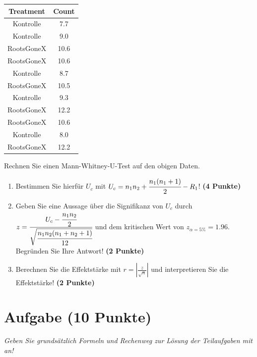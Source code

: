 \documentclass[a4paper, 10pt]{scrartcl}\usepackage[]{graphicx}\usepackage[]{xcolor}
\newenvironment{knitrout}{}{} %
\begin{document}
\begin{knitrout}
\color{fgcolor}\begin{table}[!h]
\centering
\begin{tabular}{cc}
\toprule
Treatment & Count\\
\midrule
Kontrolle & 7.7\\
Kontrolle & 9.0\\
RootsGoneX & 10.6\\
RootsGoneX & 10.6\\
Kontrolle & 8.7\\
\addlinespace
RootsGoneX & 10.5\\
Kontrolle & 9.3\\
RootsGoneX & 12.2\\
RootsGoneX & 10.6\\
Kontrolle & 8.0\\
\addlinespace
RootsGoneX & 12.2\\
\bottomrule
\end{tabular}
\end{table}

\end{knitrout}

Rechnen Sie einen Mann-Whitney-U-Test auf den obigen Daten.

\begin{enumerate}
\item Bestimmen Sie hierf{\"u}r $U_c$ mit $U_c = n_1n_2 +
  \cfrac{n_1(n_1+1)}{2}-R_1$! \textbf{(4 Punkte)} 
\item Geben Sie eine Aussage {\"u}ber die Signifikanz von $U_c$ durch
  $z = \cfrac{U_c -
    \cfrac{n_1n_2}{2}}{\sqrt{\cfrac{n_1n_2(n_1+n_2+1)}{12}}}$ und dem
  kritischen Wert von $z_{\alpha = 5\%} = 1.96$. Begr{\"u}nden Sie Ihre
  Antwort! \textbf{(2 Punkte)}
\item Berechnen Sie die Effektst{\"a}rke mit $r = |\frac{z}{\sqrt{n}}| $ und
  interpretieren Sie die Effektst{\"a}rke! \textbf{(2 Punkte)} 
\end{enumerate} 
\clearpage

\section{Aufgabe \hfill (10 Punkte)}

\textit{Geben Sie grunds{\"a}tzlich Formeln und Rechenweg zur L{\"o}sung der
  Teilaufgaben mit an!} \\[1Ex]
\end{document}
